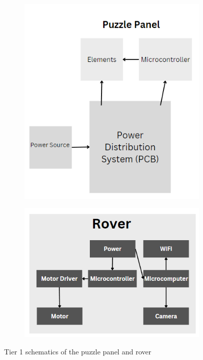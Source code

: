 \documentclass[a4paper, 10pt]{article}
\begin{document}
		\begin{figure}[h]
			\centering
			\begin{subfigure}[h]{0.44\textwidth}
				\centering
				\includegraphics[width=\textwidth]{Photos/Puzzle Panel tier 1 schematic}
			\end{subfigure}
			\hfill
			\begin{subfigure}[h]{0.55\textwidth}
				\centering
				\includegraphics[width=\textwidth]{Photos/Rover tier 1 schematic}
			\end{subfigure}
			\centering
			\caption{Tier 1 schematics of the puzzle panel and rover}
			\label{tier_1_schems}
		\end{figure}
\end{document}
